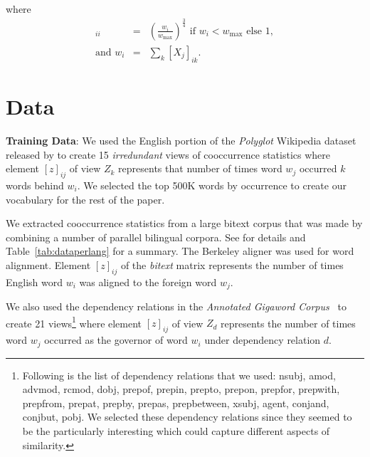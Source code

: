 \documentclass[11pt]{article}
\newcommand{\xline}[0]{\noindent\underline{\makebox[0.1cm][l]{}}}
\newcommand{\remove}[1]{}
\begin{document}
where
\begin{eqnarray}
[W_j]_{ii} &=& \left(\frac{w_i}{w_{\max}}\right)^{\frac{3}{4}} \text{ if } w_i <
  w_{\max} \text{ else } 1, \nonumber \\
  \text{and } w_i &=&  \sum_k [X_j]_{ik}. \nonumber
\end{eqnarray}


\section{Data}
\label{sec:data}
\noindent\textbf{Training Data}: We used the English portion of the \textit{Polyglot} Wikipedia dataset
released by  to create 15 \emph{irredundant} views of
cooccurrence statistics where element $[z]_{ij}$ of view $Z_k$
represents that number of times word $w_j$ occurred $k$ words behind
$w_i$. \remove{We lowercased all the words and discarded all
words which were longer than 5 characters and contained more than 3 non
alphabetical symbols. This was done to preserves years and smaller
numbers.}
We selected the top 500K words by occurrence to 
create our vocabulary for the rest of the paper.

We extracted cooccurrence statistics from a large bitext corpus that was made by combining a
number of parallel bilingual corpora. See \cite{ganitkevitch2013ppdb} for details and
Table~\ref{tab:dataperlang} for a summary. The Berkeley aligner was used for word alignment. Element
$[z]_{ij}$ of the \textit{bitext} matrix represents the number of times English
word $w_i$ was aligned to the foreign word $w_j$.

We also used the dependency relations in the \textit{Annotated
  Gigaword Corpus}~\cite{annotatedGigaword12} to create 21
views\footnote{Following is the list of dependency relations that we
  used: nsubj, amod, advmod, rcmod, dobj, prep\xline{}of,
  prep\xline{}in, prep\xline{}to, prep\xline{}on, prep\xline{}for,
  prep\xline{}with, prep\xline{}from, prep\xline{}at, prep\xline{}by,
  prep\xline{}as, prep\xline{}between, xsubj, agent, conj\xline{}and,
  conj\xline{}but, pobj. We selected these dependency relations since
  they seemed to be the particularly interesting which could capture
  different aspects of similarity.}  where element $[z]_{ij}$ of view
$Z_d$ represents the number of times word $w_j$ occurred
as the governor of word $w_i$ under dependency relation $d$.
\end{document}
